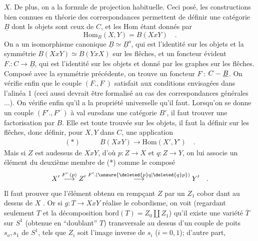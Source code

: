 

$X$. De plus, on a la formule  de projection habituelle. Ceci posé, les
constructions bien connues en théorie des correspondances permettent
de définir une catégorie $\underline{B}$ dont ls objets sont ceux de $C$, et les
Hom étant donnés par
\[
\mathrm{Hom}_{B}(X,Y) = B(XxY) \quad .
\]
On a un isomorphisme canonique $\underline{B} \simeq \underline{B}^{o}$, qui est l'identité sur les
objets et la symmétrie $B(XxY)\simeq B(YxX)$ sur les flêches, et un foncteur
évident  $F. : C \to \underline{B}$, qui est l'identité sur les objets et donné
par les graphes sur les flêches. Composé avec la symmétrie précédente,
on trouve un foncteur $F^{\cdot}$:  $C \relbar \underline{B}$. On vérifie enfin que le couple
$(F.,F^{\cdot})$ satisfait aux conditions envisagées dans l'alinéa 1 (ceci aussi
devrait être formalisé au cas des correspondances générales ...). On
vérifie enfin qu'il a la propriété universelle qu'il faut. Lorsqu'on
se donne un couple $(F'.,F'^{\cdot})$ à val eursdans une catégorie $B'$, il faut
trouver une factorisation par $B$. Elle est toute trouvée sur les
objets, il faut la définir sur les flêches, donc définir, pour $X,Y$
dans $C$, une application
\[
\begin{array}{ll}
(*) & \qquad B(XxY) \to \mathrm{Hom}(X',Y') \quad .
\end{array}
\]
Mais si $Z$ est audessus de $XxY$, d'où $p:Z\to X$ et $q:Z\to Y$, on lui associe
un élément du deuxième membre de (*) comme le composé
\[
X' \overset{F'^{\cdot}(p)}{\longrightarrow} Z' \overset{F'.(\unsure{\deleted{p}q|\deleted{q}p})}{\longrightarrow} Y' \quad .
\]
Il faut prouver que l'élément obtenu en rempçant $Z$  par un $Z_1$ cobor
dant au dessus de $X$ . Or si $g:T\to XxY$ réalise le cobordisme, on
voit (regardant seulement $T$ et la décomposition $\mathrm{bord}(T) = Z_0\amalg Z_1$)
qu'il existe une variété $\overline{T}$ sur $S^1$ (obtenue en ``doublant'' $T$) 
 transversale au dessus d'un couple de poits $s_o,s_1$
de $S^1$, tels que $Z_i$ soit l'image inverse  de $s_i$ ($i=0,1$); d'autre part,

